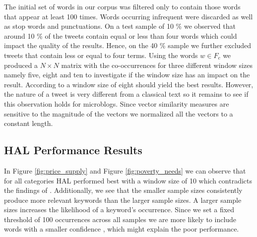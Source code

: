 The initial set of words in our corpus was filtered only to contain those words that appear at least 100 times. Words occurring infrequent were discarded as well as stop words and punctuations. On a test sample of 10 \% we observed that around 10 \% of the tweets contain equal or less than four words which could impact the quality of the results. Hence, on the 40 \% sample we further excluded tweets that contain less or equal to four terms. Using the words $w \in F_c$ we produced a $N \times N$ matrix with the co-occurrences for three different window sizes namely five, eight and ten to investigate if the window size has an impact on the result. According to \cite{lund96} a window size of eight should yield the best results. However, the nature of a tweet is very different from a classical text so it remains to see if this observation holds for microblogs. Since vector similarity measures are sensitive to the magnitude of the vectors we normalized all the vectors to a constant length. 

\subsection{HAL Performance Results}


In Figure \ref{fig:price_supply} and Figure \ref{fig:poverty_needs} we can observe that for all categories HAL performed best with a window size of 10 which contradicts the findings of \cite{lund96}. Additionally, we see that the smaller sample sizes consistently produce more relevant keywords than the larger sample sizes.  A larger sample sizes increases the likelihood of a keyword's occurrence. Since we set a fixed threshold of 100 occurrences across all samples we are more likely to include words with a smaller confidence , which might explain the poor performance. 


